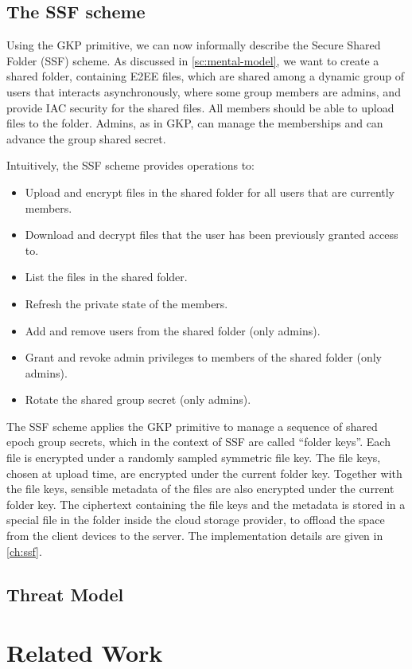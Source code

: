 \subsection{The SSF scheme}\label{sc:SSF-scheme}

Using the GKP primitive, we can now informally describe the Secure Shared Folder (SSF) scheme.
As discussed in \cref{sc:mental-model}, we want to create 
a shared folder, containing E2EE files, which are shared
among a dynamic group of users that interacts asynchronously, where
some group members are admins, and provide IAC security for the shared files. 
All members should be able to
upload files to the folder. Admins, as in GKP, can manage the
memberships and can advance the group shared secret.

Intuitively, the SSF scheme provides operations to:
\begin{itemize}
    \item Upload and encrypt files in the shared folder for all users that
    are currently members.
    \item Download and decrypt files that the user has been previously granted access to. 
    \item List the files in the shared folder.
    \item Refresh the private state of the members.
    \item Add and remove users from the shared folder (only admins).
    \item Grant and revoke admin privileges to members of the shared folder (only admins).
    \item Rotate the shared group secret (only admins).
\end{itemize}

The SSF scheme applies the GKP primitive to manage a sequence
of shared epoch group secrets, which in the context of SSF are called
``folder keys''. 
Each file is encrypted under a randomly sampled symmetric file key.
The file keys, chosen at upload time, are encrypted under the current
folder key. Together with the file keys, sensible metadata of the files
are also encrypted under the current folder key.
The ciphertext containing the file keys and the metadata is stored
in a special file in the folder inside the cloud storage provider,
to offload the space from the client devices to the server.
The implementation details are given in \cref{ch:ssf}.

\subsection{Threat Model}

\section{Related Work}\label{sc:related-work}






